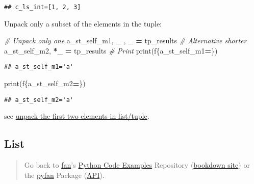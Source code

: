 \documentclass[
]{book}
\newenvironment{Shaded}{\begin{snugshade}}{\end{snugshade}}
\newcommand{\BuiltInTok}[1]{#1}
\newcommand{\CommentTok}[1]{\textcolor[rgb]{0.56,0.35,0.01}{\textit{#1}}}
\newcommand{\NormalTok}[1]{#1}
\newcommand{\OperatorTok}[1]{\textcolor[rgb]{0.81,0.36,0.00}{\textbf{#1}}}
\newcommand{\SpecialCharTok}[1]{\textcolor[rgb]{0.00,0.00,0.00}{#1}}
\newcommand{\SpecialStringTok}[1]{\textcolor[rgb]{0.31,0.60,0.02}{#1}}
\begin{document}
\begin{verbatim}
## c_ls_int=[1, 2, 3]
\end{verbatim}

Unpack only a subset of the elements in the tuple:

\begin{Shaded}
\begin{Highlighting}[]
\CommentTok{\# Unpack only one}
\NormalTok{a\_st\_self\_m1, \_ , \_ }\OperatorTok{=}\NormalTok{ tp\_results}
\CommentTok{\# Alternative shorter}
\NormalTok{a\_st\_self\_m2, }\OperatorTok{*}\NormalTok{\_  }\OperatorTok{=}\NormalTok{ tp\_results}
\CommentTok{\# Print}
\BuiltInTok{print}\NormalTok{(}\SpecialStringTok{f\textquotesingle{}}\SpecialCharTok{\{}\NormalTok{a\_st\_self\_m1}\OperatorTok{=}\SpecialCharTok{\}}\SpecialStringTok{\textquotesingle{}}\NormalTok{)}
\end{Highlighting}
\end{Shaded}

\begin{verbatim}
## a_st_self_m1='a'
\end{verbatim}

\begin{Shaded}
\begin{Highlighting}[]
\BuiltInTok{print}\NormalTok{(}\SpecialStringTok{f\textquotesingle{}}\SpecialCharTok{\{}\NormalTok{a\_st\_self\_m2}\OperatorTok{=}\SpecialCharTok{\}}\SpecialStringTok{\textquotesingle{}}\NormalTok{)}
\end{Highlighting}
\end{Shaded}

\begin{verbatim}
## a_st_self_m2='a'
\end{verbatim}

see \href{https://stackoverflow.com/a/11371230/8280804}{unpack the first two elements in list/tuple}.

\hypertarget{list}{%
\subsection{List}\label{list}}

\begin{quote}
Go back to \href{http://fanwangecon.github.io/}{fan}'s \href{https://fanwangecon.github.io/Py4Econ/}{Python Code Examples} Repository (\href{https://fanwangecon.github.io/Py4Econ/bookdown}{bookdown site}) or the \href{https://pyfan.readthedocs.io/en/latest/}{pyfan} Package (\href{https://pyfan.readthedocs.io/en/latest/reference.html}{API}).
\end{quote}
\end{document}
